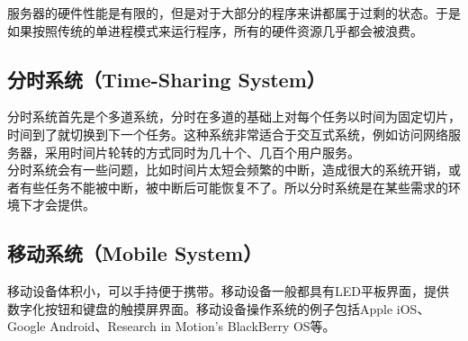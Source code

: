 服务器的硬件性能是有限的，但是对于大部分的程序来讲都属于过剩的状态。于是如果按照传统的单进程模式来运行程序，所有的硬件资源几乎都会被浪费。\\

\subsection{分时系统（Time-Sharing System）}

分时系统首先是个多道系统，分时在多道的基础上对每个任务以时间为固定切片，时间到了就切换到下一个任务。这种系统非常适合于交互式系统，例如访问网络服务器，采用时间片轮转的方式同时为几十个、几百个用户服务。\\

分时系统会有一些问题，比如时间片太短会频繁的中断，造成很大的系统开销，或者有些任务不能被中断，被中断后可能恢复不了。所以分时系统是在某些需求的环境下才会提供。\\

\subsection{移动系统（Mobile System）}

移动设备体积小，可以手持便于携带。移动设备一般都具有LED平板界面，提供数字化按钮和键盘的触摸屏界面。移动设备操作系统的例子包括Apple iOS、Google Android、Research in Motion's BlackBerry OS等。

\newpage